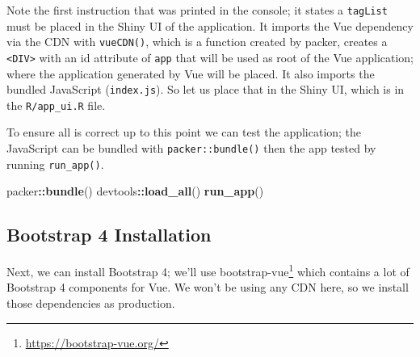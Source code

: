 \documentclass[10pt,]{krantz}
\makeatletter
\newenvironment{Shaded}{\begin{snugshade}}{\end{snugshade}}
\newcommand{\ControlFlowTok}[1]{\textcolor[rgb]{0.27,0.27,0.27}{\textbf{#1}}}
\newcommand{\DataTypeTok}[1]{\textcolor[rgb]{0.27,0.27,0.27}{#1}}
\newcommand{\KeywordTok}[1]{\textcolor[rgb]{0.27,0.27,0.27}{\textbf{#1}}}
\newcommand{\NormalTok}[1]{#1}
\newcommand{\OperatorTok}[1]{\textcolor[rgb]{0.43,0.43,0.43}{\textbf{#1}}}
\newcommand{\StringTok}[1]{\textcolor[rgb]{0.5,0.5,0.5}{#1}}
\renewcommand{\href}[2]{#2\footnote{\url{#1}}}
\newenvironment{kframe}{%
\medskip{}
\setlength{\fboxsep}{.8em}
 \def\at@end@of@kframe{}%
 \ifinner\ifhmode%
  \def\at@end@of@kframe{\end{minipage}}%
  \begin{minipage}{\columnwidth}%
 \fi\fi%
 \def\FrameCommand##1{\hskip\@totalleftmargin \hskip-\fboxsep
 \colorbox{shadecolor}{##1}\hskip-\fboxsep
     \hskip-\linewidth \hskip-\@totalleftmargin \hskip\columnwidth}%
 \MakeFramed {\advance\hsize-\width
   \@totalleftmargin\z@ \linewidth\hsize
   \@setminipage}}%
 {\par\unskip\endMakeFramed%
 \at@end@of@kframe}
\renewenvironment{Shaded}{\begin{kframe}}{\end{kframe}}
\makeatother
\begin{document}
Note the first instruction that was printed in the console; it states a \texttt{tagList} must be placed in the Shiny UI of the application. It imports the Vue dependency via the CDN with \texttt{vueCDN()}, which is a function created by packer, creates a \texttt{\textless{}DIV\textgreater{}} with an id attribute of \texttt{app} that will be used as root of the Vue application; where the application generated by Vue will be placed. It also imports the bundled JavaScript (\texttt{index.js}). So let us place that in the Shiny UI, which is in the \texttt{R/app\_ui.R} file.

\begin{Shaded}
\end{Shaded}

To ensure all is correct up to this point we can test the application; the JavaScript can be bundled with \texttt{packer::bundle()} then the app tested by running \texttt{run\_app()}.

\begin{Shaded}
\begin{Highlighting}[]
\NormalTok{packer}\OperatorTok{::}\KeywordTok{bundle}\NormalTok{()}
\NormalTok{devtools}\OperatorTok{::}\KeywordTok{load_all}\NormalTok{()}
\KeywordTok{run_app}\NormalTok{()}
\end{Highlighting}
\end{Shaded}

\hypertarget{packer-adv-shiny-vue-bs4}{%
\subsection{Bootstrap 4 Installation}\label{packer-adv-shiny-vue-bs4}}

Next, we can install Bootstrap 4; we'll use \href{https://bootstrap-vue.org/}{bootstrap-vue} which contains a lot of Bootstrap 4 components for Vue. We won't be using any CDN here, so we install those dependencies as production.
\end{document}
